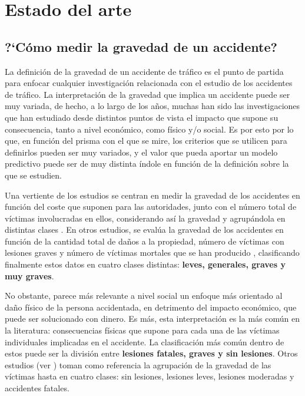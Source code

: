 \documentclass{uathesis-es}
\begin{document}
\chapter{Estado del arte}

\section{?`Cómo medir la gravedad de un accidente?}

La definición de la gravedad de un accidente de tráfico es el punto de partida para enfocar cualquier investigación relacionada con el estudio de los accidentes de tráfico. La interpretación de la gravedad que implica un accidente puede ser muy variada, de hecho, a lo largo de los años, muchas han sido las investigaciones que han estudiado desde distintos puntos de vista el impacto que supone su consecuencia, tanto a nivel económico, como físico y/o social. Es por esto por lo que, en función del prisma con el que se mire, los criterios que se utilicen para definirlos pueden ser muy variados, y el valor que pueda aportar un modelo predictivo puede ser de muy distinta índole en función de la definición sobre la que se estudien.


Una vertiente de los estudios se centran en medir la gravedad de los accidentes en función del coste que suponen para las autoridades, junto con el número total de víctimas involucradas en ellos, considerando así la gravedad y agrupándola en distintas clases \cite{app7060476}. En otros estudios, se evalúa la gravedad de los accidentes en función de la cantidad total de daños a la propiedad, número de víctimas con lesiones graves y número de víctimas mortales que se han producido \cite{Yang2023}, clasificando finalmente estos datos en cuatro clases distintas: \textbf{leves, generales, graves y muy graves}.

No obstante, parece más relevante a nivel social un enfoque más orientado al daño físico de la persona accidentada, en detrimento del impacto económico, que puede ser solucionado con dinero. Es más, esta interpretación es la más común en la literatura: consecuencias físicas que supone para cada una de las víctimas individuales implicadas en el accidente. La clasificación más común dentro de estos puede ser la división entre \textbf{lesiones fatales, graves y sin lesiones}. Otros estudios (ver \cite{panicker2022injury}) toman como referencia la agrupación de la gravedad de las víctimas hasta en cuatro clases: sin lesiones, lesiones leves, lesiones moderadas y accidentes fatales.
\end{document}
